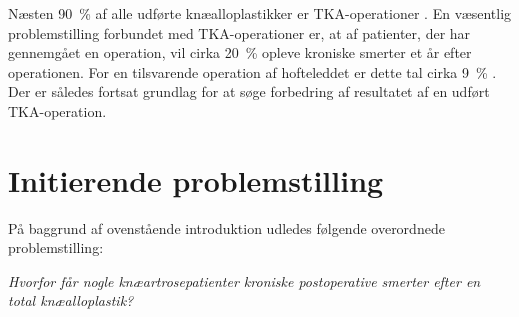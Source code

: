 Næsten 90~\% af alle udførte knæalloplastikker er TKA-operationer \citep{aarsrapport2016}. En væsentlig problemstilling forbundet med TKA-operationer er, at af patienter, der har gennemgået en operation, vil cirka 20~\% opleve kroniske smerter et år efter operationen. For en tilsvarende operation af hofteleddet er dette tal cirka 9~\% \citep{Beswick2012}. Der er således fortsat grundlag for at søge forbedring af resultatet af en udført TKA-operation.  

\section{Initierende problemstilling}
På baggrund af ovenstående introduktion udledes følgende overordnede problemstilling: 
\begin{center}
	\textit{Hvorfor får nogle knæartrosepatienter kroniske postoperative smerter efter en total knæalloplastik?}
\end{center}

